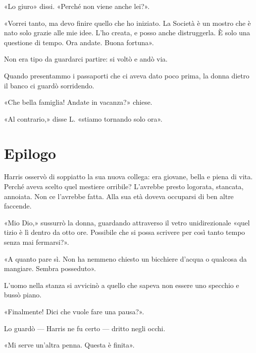 \documentclass[a4paper,10pt]{memoir}
\begin{document}
«Lo giuro» dissi. «Perché non viene anche lei?».

«Vorrei tanto, ma devo finire quello che ho iniziato. La Società è un mostro che è nato solo grazie alle mie idee. L'ho
creata, e posso anche distruggerla. È solo una questione di tempo. Ora andate. Buona fortuna».

Non era tipo da guardarci partire: si voltò e andò via.

Quando presentammo i passaporti che ci aveva dato poco prima, la donna dietro il banco ci guardò sorridendo.

«Che bella famiglia! Andate in vacanza?» chiese.

«Al contrario,» disse L. «stiamo tornando solo ora».

\backmatter

\chapter{Epilogo}

Harris osservò di soppiatto la sua nuova collega: era giovane, bella e piena di vita. Perché aveva scelto quel mestiere
orribile? L'avrebbe presto logorata, stancata, annoiata. Non ce l'avrebbe fatta. Alla sua età doveva occuparsi di ben
altre faccende.

«Mio Dio,» sussurrò la donna, guardando attraverso il vetro unidirezionale «quel tizio è lì dentro da otto ore.
Possibile che si possa scrivere per così tanto tempo senza mai fermarsi?».

«A quanto pare sì. Non ha nemmeno chiesto un bicchiere d'acqua o qualcosa da mangiare. Sembra posseduto».

L'uomo nella stanza si avvicinò a quello che sapeva non essere uno specchio e bussò piano.

«Finalmente! Dici che vuole fare una pausa?».

Lo guardò --- Harris ne fu certo --- dritto negli occhi.

«Mi serve un'altra penna. Questa è finita».
\end{document}
